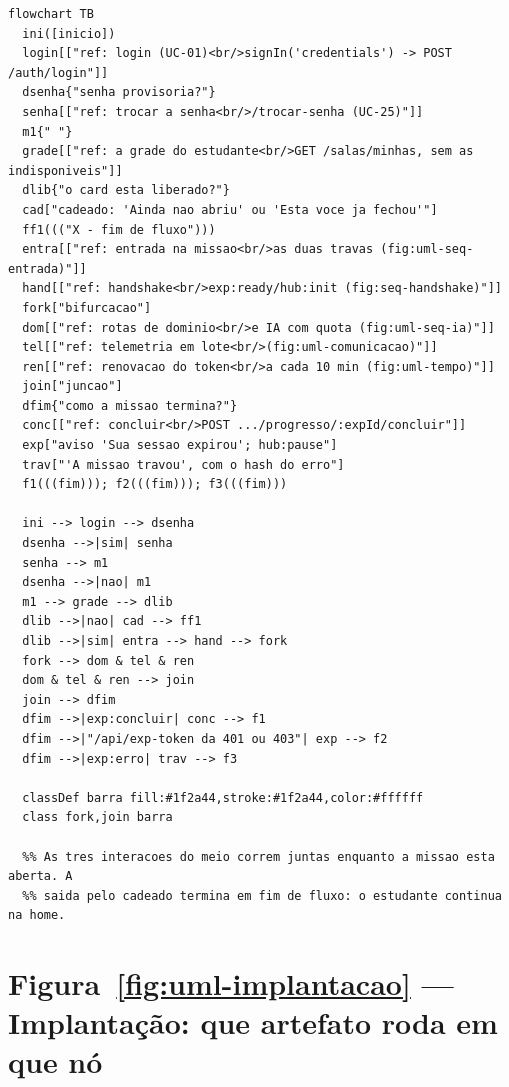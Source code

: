 \begin{lstlisting}[language=mermaid]
%% aproximacao: o Mermaid nao tem diagrama de visao geral de interacao; cada quadro ref vira um no de sub-rotina com a figura em que a interacao esta desenhada, e as barras de bifurcacao e juncao viram nos estreitos.
flowchart TB
  ini([inicio])
  login[["ref: login (UC-01)<br/>signIn('credentials') -> POST /auth/login"]]
  dsenha{"senha provisoria?"}
  senha[["ref: trocar a senha<br/>/trocar-senha (UC-25)"]]
  m1{" "}
  grade[["ref: a grade do estudante<br/>GET /salas/minhas, sem as indisponiveis"]]
  dlib{"o card esta liberado?"}
  cad["cadeado: 'Ainda nao abriu' ou 'Esta voce ja fechou'"]
  ff1((("X - fim de fluxo")))
  entra[["ref: entrada na missao<br/>as duas travas (fig:uml-seq-entrada)"]]
  hand[["ref: handshake<br/>exp:ready/hub:init (fig:seq-handshake)"]]
  fork["bifurcacao"]
  dom[["ref: rotas de dominio<br/>e IA com quota (fig:uml-seq-ia)"]]
  tel[["ref: telemetria em lote<br/>(fig:uml-comunicacao)"]]
  ren[["ref: renovacao do token<br/>a cada 10 min (fig:uml-tempo)"]]
  join["juncao"]
  dfim{"como a missao termina?"}
  conc[["ref: concluir<br/>POST .../progresso/:expId/concluir"]]
  exp["aviso 'Sua sessao expirou'; hub:pause"]
  trav["'A missao travou', com o hash do erro"]
  f1(((fim))); f2(((fim))); f3(((fim)))

  ini --> login --> dsenha
  dsenha -->|sim| senha
  senha --> m1
  dsenha -->|nao| m1
  m1 --> grade --> dlib
  dlib -->|nao| cad --> ff1
  dlib -->|sim| entra --> hand --> fork
  fork --> dom & tel & ren
  dom & tel & ren --> join
  join --> dfim
  dfim -->|exp:concluir| conc --> f1
  dfim -->|"/api/exp-token da 401 ou 403"| exp --> f2
  dfim -->|exp:erro| trav --> f3

  classDef barra fill:#1f2a44,stroke:#1f2a44,color:#ffffff
  class fork,join barra

  %% As tres interacoes do meio correm juntas enquanto a missao esta aberta. A
  %% saida pelo cadeado termina em fim de fluxo: o estudante continua na home.
\end{lstlisting}

\section{Figura~\ref{fig:uml-implantacao} --- Implantação: que artefato roda em que nó}

